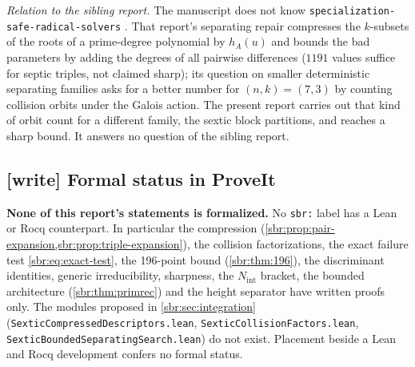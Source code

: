 \documentclass[11pt,letterpaper]{article}
\numberwithin{equation}{section}
\theoremstyle{definition}
\theoremstyle{remark}
\newcommand{\src}[1]{\texttt{\nolinkurl{#1}}}
\begin{document}
\emph{Relation to the sibling report.} The manuscript does not know
\src{specialization-safe-radical-solvers} \cite{rss}. That report's
separating repair compresses the $k$-subsets of the roots of a prime-degree
polynomial by $h_A(u)$ and bounds the bad parameters by adding the degrees
of all pairwise differences ($1191$ values suffice for septic triples, not
claimed sharp); its question on smaller deterministic separating families
asks for a better number for $(n,k)=(7,3)$ by counting collision orbits
under the Galois action. The present report carries out that kind of orbit
count for a different family, the sextic block partitions, and reaches a
sharp bound. It answers no question of the sibling report.

\subsection{[write] Formal status in ProveIt}
\label{sbr:sec:formal}

\textbf{None of this report's statements is formalized.} No
\src{sbr:} label has a Lean or Rocq counterpart. In particular the
compression (\cref{sbr:prop:pair-expansion,sbr:prop:triple-expansion}),
the collision factorizations, the exact failure test
\cref{sbr:eq:exact-test}, the 196-point bound (\cref{sbr:thm:196}), the
discriminant identities, generic irreducibility, sharpness, the
$N_{\mathrm{int}}$ bracket, the bounded architecture
(\cref{sbr:thm:primrec}) and the height separator have written proofs only.
The modules proposed in \cref{sbr:sec:integration}
(\src{SexticCompressedDescriptors.lean}, \src{SexticCollisionFactors.lean},
\src{SexticBoundedSeparatingSearch.lean}) do not exist. Placement beside a
Lean and Rocq development confers no formal status.
\end{document}
